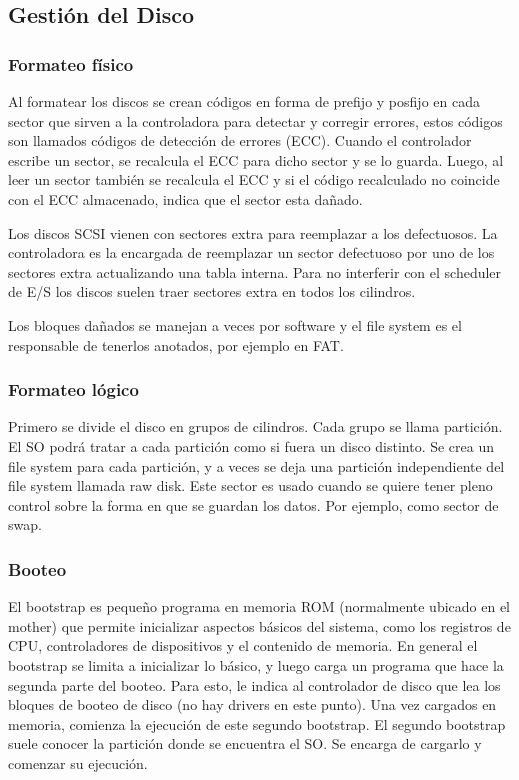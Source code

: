 \documentclass{article}
\begin{document}
\subsection{Gesti\'on del Disco}

\subsubsection{Formateo f\'isico}

Al formatear los discos se crean c\'odigos en forma de prefijo y posfijo en cada sector que sirven a la controladora para detectar y corregir errores, estos códigos son llamados códigos de detección de errores (ECC). Cuando el controlador escribe un sector, se recalcula el ECC para dicho sector y se lo guarda. Luego, al leer un sector también se recalcula el ECC y si el código recalculado no coincide con el ECC almacenado, indica que el sector esta dañado.

Los discos SCSI vienen con sectores extra para reemplazar a los defectuosos. La controladora es la encargada de reemplazar un sector defectuoso por uno de los sectores extra actualizando una tabla interna. Para no interferir con el scheduler de E/S los discos suelen traer sectores extra en todos los cilindros.

Los bloques da\~nados se manejan a veces por software y el file system es el responsable de tenerlos anotados, por ejemplo en FAT.

\subsubsection{Formateo l\'ogico}

Primero se divide el disco en grupos de cilindros. Cada grupo se
llama partición. El SO podrá tratar a cada partición como si fuera
un disco distinto. Se crea un file system para cada partición, y a veces se
deja una partición independiente del file system llamada raw disk. Este sector es usado cuando se quiere tener pleno control sobre la
forma en que se guardan los datos. Por ejemplo, como sector de swap.

\subsubsection{Booteo}
El bootstrap es pequeño programa en memoria ROM (normalmente ubicado en el mother) que permite inicializar aspectos básicos del sistema, como los registros de CPU, controladores de dispositivos y el contenido de memoria. En general el bootstrap se limita a inicializar lo básico, y luego
carga un programa que hace la segunda parte del booteo. Para esto, le indica al controlador de disco que lea los bloques de booteo de disco (no hay drivers en este punto). 
Una vez cargados en memoria, comienza la ejecución de este segundo bootstrap. El segundo bootstrap suele conocer la partición donde se encuentra el SO. Se encarga de cargarlo y comenzar su ejecución.
\end{document}
